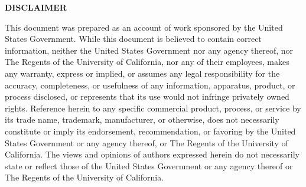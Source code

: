 \begin{center}
\bf \Large DISCLAIMER
\end{center}
This document was prepared as an account of work sponsored by the United States
Government. While this document is believed to contain correct information, neither the
United States Government nor any agency thereof, nor The Regents of the University of
California, nor any of their employees, makes any warranty, express or implied, or assumes
any legal responsibility for the accuracy, completeness, or usefulness of any information,
apparatus, product, or process disclosed, or represents that its use would not infringe
privately owned rights. Reference herein to any specific commercial product, process, or
service by its trade name, trademark, manufacturer, or otherwise, does not necessarily
constitute or imply its endorsement, recommendation, or favoring by the United States
Government or any agency thereof, or The Regents of the University of California. The
views and opinions of authors expressed herein do not necessarily state or reflect those of the
United States Government or any agency thereof or The Regents of the University of
California.
